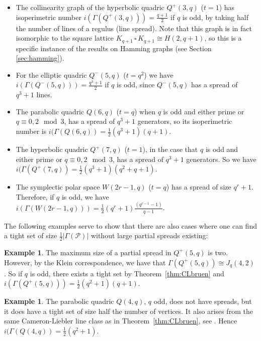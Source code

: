 \documentclass[a4paper,11pt]{article}
\theoremstyle{definition}
\newtheorem{example}[theorem]{Example}
\newcommand{\cartesianproduct}{\,\square\,}
\begin{document}
\begin{itemize}
    \item The collinearity graph of the hyperbolic quadric \(Q^+(3,q)\) ($t=1$) has isoperimetric number \(i(\Gamma(Q^+(3,q)))=\frac{q+1}{2}\) if \(q\) is odd, by taking half the number of lines of a regulus (line spread). Note that this graph is in fact isomorphic to the square lattice \(K_{q+1}\cartesianproduct K_{q+1}\cong H(2,q+1)\), so this is a specific instance of the results on Hamming graphs (see Section \ref{sec:hamming}).
    \item For the elliptic quadric \(Q^-(5,q)\) ($t=q^2$) we have \(i(\Gamma(Q^-(5,q)))=\frac{q^3+1}{2}\) if \(q\) is odd, since $Q^-(5,q)$ has a spread of $q^3+1$ lines.
    \item The parabolic quadric \(Q(6,q)\) ($t=q$) when $q$ is odd and either prime or $q \equiv 0,2 \mod 3$, has a spread of $q^3+1$ generators, so its isoperimetric number is $i(\Gamma(Q(6,q)) = \frac12(q^3+1)(q+1)$.
    \item  The hyperbolic quadric $Q^+(7,q)$ ($t=1$), in the case that $q$ is odd and either prime or $q \equiv 0,2 \mod 3$, has a spread of $q^3+1$ generators. So we have $i(\Gamma(Q^+(7,q)) = \frac 12 (q^3+1)(q^2+q+1)$.
    \item The symplectic polar space $W(2r-1,q)$ ($t=q$) has a spread of size $q^r+1$. Therefore, if $q$ is odd, we have $i(\Gamma(W(2r-1,q))) = \frac12(q^r+1)\frac{(q^{r-1}-1)}{q-1}$.
\end{itemize}


The following examples serve to show that there are also cases where one can find a tight set of size $\frac12 |\Gamma(\mathcal{P})|$ without large partial spreads existing:
\begin{example}\label{exa:Q+(5,q)}
    The maximum size of a partial spread in \(Q^+(5,q)\) is two. However, by the Klein correspondence, we have that $\Gamma(Q^+(5,q))\cong J_q(4,2)$ \cite{Drudge}. So if \(q\) is odd, there exists a tight set by Theorem~\ref{thm:CLbruen} and \(i(\Gamma(Q^+(5,q)))=\frac12(q^2+1)(q+1)\).
\end{example}
\begin{example}
    The parabolic quadric $Q(4,q)$, \(q\) odd, does not have spreads, but it does have a tight set of size half the number of vertices. It also arises from the same Cameron-Liebler line class as in Theorem~\ref{thm:CLbruen}, see \cite{Bamberg2009}. Hence $i(\Gamma(Q(4,q)) = \frac12(q^2+1)$.
\end{example}
\end{document}

